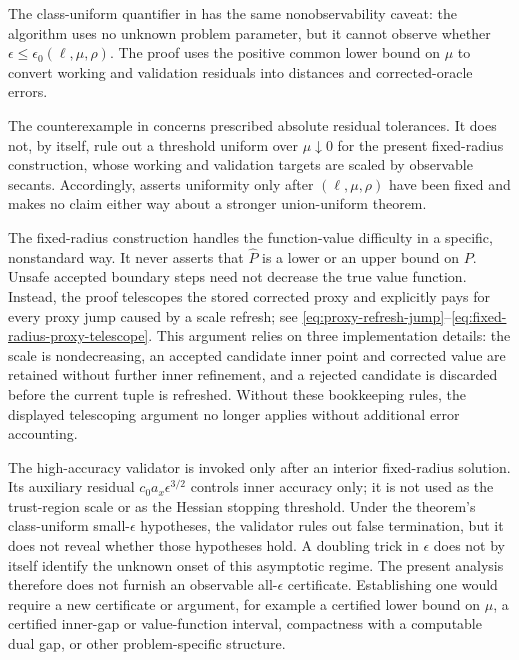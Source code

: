\documentclass{article}
\begin{document}
The class-uniform quantifier in
 has the same nonobservability
caveat: the algorithm uses no unknown problem parameter, but it cannot
observe whether $\epsilon\le\epsilon_0(\ell,\mu,\rho)$.  The proof uses
the positive common lower bound on $\mu$ to convert working and
validation residuals into distances and corrected-oracle errors.

The counterexample in  concerns prescribed
absolute residual tolerances.  It does not, by itself, rule out a
threshold uniform over $\mu\downarrow0$ for the present fixed-radius
construction, whose working and validation targets are scaled by
observable secants.  Accordingly, 
asserts uniformity only after $(\ell,\mu,\rho)$ have been fixed and
makes no claim either way about a stronger union-uniform theorem.

The fixed-radius construction handles the function-value difficulty
in a specific, nonstandard way.  It never asserts that
$\widehat P$ is a lower or an upper bound on $P$.  Unsafe accepted
boundary steps need not decrease the true value function.  Instead,
the proof telescopes the stored corrected proxy and explicitly pays
for every proxy jump caused by a scale refresh; see
\eqref{eq:proxy-refresh-jump}--\eqref{eq:fixed-radius-proxy-telescope}.
This argument relies on three implementation details: the scale is
nondecreasing, an accepted candidate inner point and corrected value
are retained without further inner refinement, and a rejected candidate
is discarded before the current tuple is refreshed.  Without these
bookkeeping rules, the displayed telescoping argument no longer
applies without additional error accounting.

The high-accuracy validator is invoked only after an interior
fixed-radius solution.  Its auxiliary residual
$c_0a_x\epsilon^{3/2}$ controls inner accuracy only; it is not used as
the trust-region scale or as the Hessian stopping threshold.  Under
the theorem's class-uniform small-$\epsilon$ hypotheses, the validator
rules out false termination, but it does not reveal whether those
hypotheses hold.  A doubling trick in $\epsilon$ does not by itself
identify the unknown onset of this asymptotic regime.  The present
analysis therefore does not furnish an observable all-$\epsilon$
certificate.  Establishing one would require a new certificate or
argument, for example a certified lower bound on $\mu$, a certified
inner-gap or value-function interval, compactness with a computable dual
gap, or other problem-specific structure.



\end{document}
